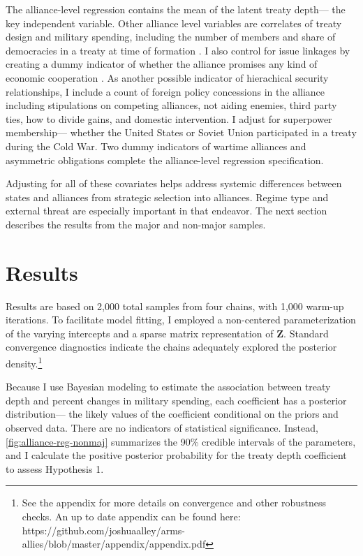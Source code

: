 \documentclass[12pt]{article}
\begin{document}
The alliance-level regression contains the mean of the latent treaty depth--- the key independent variable. 
Other alliance level variables are correlates of treaty design and military spending, including the number of members and share of democracies in a treaty at time of formation \citep{Chibaetal2015}. 
I also control for issue linkages by creating a dummy indicator of whether the alliance promises any kind of economic cooperation \citep{Poast2013, LongLeeds2006}. 
As another possible indicator of hierachical security relationships, I include a count of foreign policy concessions in the alliance including stipulations on competing alliances, not aiding enemies, third party ties, how to divide gains, and domestic intervention. 
I adjust for superpower membership--- whether the United States or Soviet Union participated in a treaty during the Cold War. 
Two dummy indicators of wartime alliances and asymmetric obligations \citep{Leedsetal2002} complete the alliance-level regression specification. 


Adjusting for all of these covariates helps address systemic differences between states and alliances from strategic selection into alliances. 
Regime type and external threat are especially important in that endeavor. 
The next section describes the results from the major and non-major samples.
 

\section{Results}


Results are based on 2,000 total samples from four chains, with 1,000 warm-up iterations. 
To facilitate model fitting, I employed a non-centered parameterization of the varying intercepts and a sparse matrix representation of \textbf{Z}. 
Standard convergence diagnostics indicate the chains adequately explored the posterior density.\footnote{See the appendix for more details on convergence and other robustness checks. An up to date appendix can be found here: https://github.com/joshuaalley/arms-allies/blob/master/appendix/appendix.pdf} 


Because I use Bayesian modeling to estimate the association between treaty depth and percent changes in military spending, each coefficient has a posterior distribution--- the likely values of the coefficient conditional on the priors and observed data.
There are no indicators of statistical significance. 
Instead, \autoref{fig:alliance-reg-nonmaj} summarizes the 90\% credible intervals of the parameters, and I calculate the positive posterior probability for the treaty depth coefficient to assess Hypothesis 1.
\end{document}
